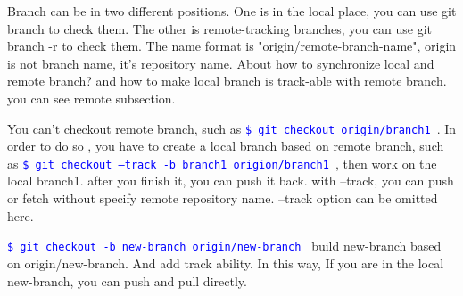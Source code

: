 \documentclass[paper=8.5in:11in, twoside, 12pt, pagesize=pdftex]{book}
\newcommand{\linuxcommand}[1]{\texttt{\textcolor{blue}{\$ #1 \Pisymbol{psy}{191}}}}
\begin{document}
	 Branch can be in two different positions. One is in the local place, you can use git branch to check them. The other is remote-tracking branches, you can use git branch -r to check them. The name format is "origin/remote-branch-name", origin is not branch name, it's repository name. About how to synchronize local and remote branch? and how to make local branch is track-able with remote branch. you can see remote subsection.
	
	You can't checkout remote branch, such as \linuxcommand{git checkout origin/branch1}. In order to do so , you have to create a local branch based on remote branch, such as \linuxcommand{git checkout --track -b branch1 origion/branch1}, then work on the local branch1. after you finish it, you can push it back. with --track, you can push or fetch without specify remote repository name. --track option can be omitted here. 
	
	\linuxcommand{git checkout -b new-branch origin/new-branch} build new-branch based on origin/new-branch. And add track ability.  In this way, If you are in the local new-branch, you can push and pull directly. 
\end{document}
